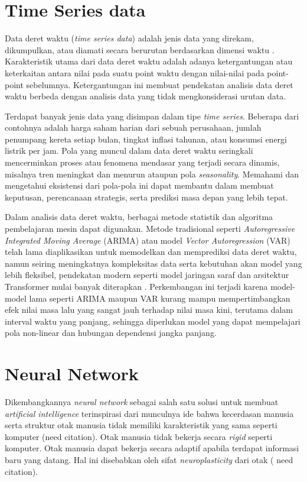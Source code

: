 \section{Time Series data}
Data deret waktu (\textit{time series data}) adalah jenis data yang direkam, dikumpulkan, atau diamati secara berurutan berdasarkan dimensi waktu \parencite{Chatfield2003}. Karakteristik utama dari data deret waktu adalah adanya ketergantungan atau keterkaitan antara nilai pada suatu point waktu dengan nilai-nilai pada point-point sebelumnya. Ketergantungan ini membuat pendekatan analisis data deret waktu berbeda dengan analisis data yang tidak mengkonsiderasi urutan data.

Terdapat banyak jenis data yang disimpan dalam tipe \textit{time series}. Beberapa dari contohnya adalah harga saham harian dari sebuah perusahaan, jumlah penumpang kereta setiap bulan, tingkat inflasi tahunan, atau konsumsi energi listrik per jam. Pola yang muncul dalam data deret waktu seringkali mencerminkan proses atau fenomena mendasar yang terjadi secara dinamis, misalnya tren meningkat dan menurun ataupun pola \textit{seasonality}. Memahami dan mengetahui eksistensi dari pola-pola ini dapat membantu dalam membuat keputusan, perencanaan strategis, serta prediksi masa depan yang lebih tepat\parencite{HyndmanAthanasopoulos2018}.

Dalam analisis data deret waktu, berbagai metode statistik dan algoritma pembelajaran mesin dapat digunakan. Metode tradisional seperti \textit{Autoregressive Integrated Moving Average} (ARIMA) atau model \textit{Vector Autoregression} (VAR) telah lama diaplikasikan untuk memodelkan dan memprediksi data deret waktu, namun seiring meningkatnya kompleksitas data serta kebutuhan akan model yang lebih fleksibel, pendekatan modern seperti model jaringan saraf dan arsitektur Transformer mulai banyak diterapkan \parencite{Goodfellow-et-al-2016}. Perkembangan ini terjadi karena model-model lama seperti ARIMA maupun VAR kurang mampu mempertimbangkan efek nilai masa lalu yang sangat jauh terhadap nilai masa kini, terutama dalam interval waktu yang panjang, sehingga diperlukan model yang dapat mempelajari pola non-linear dan hubungan dependensi jangka panjang.

 
\section{Neural Network}

Dikembangkannya \textit{neural network} sebagai salah satu solusi untuk membuat \textit{artificial intelligence} terinspirasi dari munculnya ide bahwa kecerdasan manusia  serta struktur otak manusia tidak memiliki karakteristik yang sama seperti komputer (need citation). Otak manusia tidak bekerja secara \textit{rigid} seperti komputer. Otak manusia dapat bekerja secara adaptif apabila terdapat informasi baru yang datang. Hal ini disebabkan oleh sifat \textit{neuroplasticity} dari otak ( need citation).


